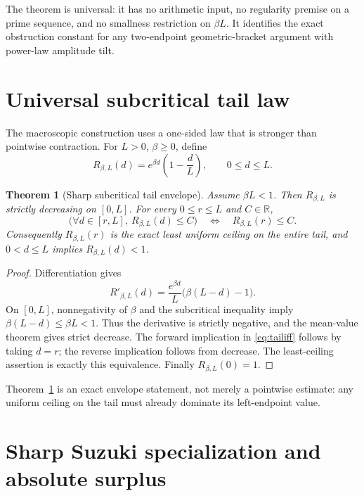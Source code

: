 \documentclass[11pt]{article}
\newtheorem{theorem}{Theorem}[section]
\newcommand{\R}{\mathbb R}
\begin{document}
The theorem is universal: it has no arithmetic input, no regularity premise on a prime sequence,
and no smallness restriction on $\beta L$.  It identifies the exact obstruction constant for any
two-endpoint geometric-bracket argument with power-law amplitude tilt.

\section{Universal subcritical tail law}\label{sec:tail}\leavevmode\par

The macroscopic construction uses a one-sided law that is stronger than pointwise contraction.
For $L>0$, $\beta\ge0$, define
\begin{equation}\label{eq:rightprofile}
 R_{\beta,L}(d)=e^{\beta d}\left(1-\frac dL\right),
 \qquad 0\le d\le L.
\end{equation}

\begin{theorem}[Sharp subcritical tail envelope]\label{thm:tail}
Assume $\beta L<1$.  Then $R_{\beta,L}$ is strictly decreasing on $[0,L]$.  For every
$0\le r\le L$ and $C\in\R$,
\begin{equation}\label{eq:tailiff}
 \bigl(\forall d\in[r,L],\ R_{\beta,L}(d)\le C\bigr)
 \quad\Longleftrightarrow\quad
 R_{\beta,L}(r)\le C.
\end{equation}
Consequently $R_{\beta,L}(r)$ is the exact least uniform ceiling on the entire tail, and
$0<d\le L$ implies $R_{\beta,L}(d)<1$.
\end{theorem}

\begin{proof}
Differentiation gives
\[
 R'_{\beta,L}(d)
 =\frac{e^{\beta d}}L\bigl(\beta(L-d)-1\bigr).
\]
On $[0,L]$, nonnegativity of $\beta$ and the subcritical inequality imply
$\beta(L-d)\le\beta L<1$.  Thus the derivative is strictly negative, and the mean-value theorem
gives strict decrease.  The forward implication in \eqref{eq:tailiff} follows by taking $d=r$;
the reverse implication follows from decrease.  The least-ceiling assertion is exactly this
equivalence.  Finally $R_{\beta,L}(0)=1$.
\end{proof}

Theorem~\ref{thm:tail} is an exact envelope statement, not merely a pointwise estimate: any
uniform ceiling on the tail must already dominate its left-endpoint value.

\section{Sharp Suzuki specialization and absolute surplus}\leavevmode\par
\end{document}
